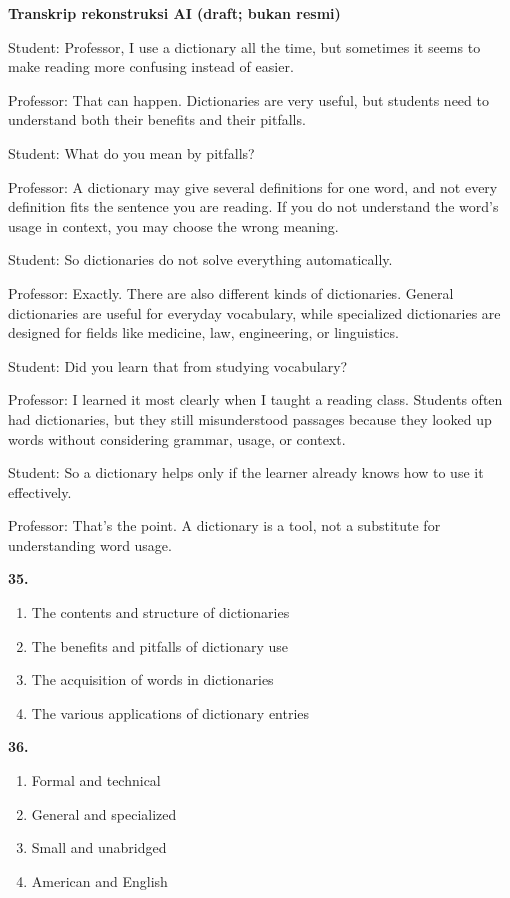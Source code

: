 \documentclass[12pt]{article}
\begin{document}
\begin{exampleblock}
\textbf{Transkrip rekonstruksi AI (draft; bukan resmi)}\par
Student: Professor, I use a dictionary all the time, but sometimes it seems to make reading more confusing instead of easier.\par
Professor: That can happen. Dictionaries are very useful, but students need to understand both their benefits and their pitfalls.\par
Student: What do you mean by pitfalls?\par
Professor: A dictionary may give several definitions for one word, and not every definition fits the sentence you are reading. If you do not understand the word's usage in context, you may choose the wrong meaning.\par
Student: So dictionaries do not solve everything automatically.\par
Professor: Exactly. There are also different kinds of dictionaries. General dictionaries are useful for everyday vocabulary, while specialized dictionaries are designed for fields like medicine, law, engineering, or linguistics.\par
Student: Did you learn that from studying vocabulary?\par
Professor: I learned it most clearly when I taught a reading class. Students often had dictionaries, but they still misunderstood passages because they looked up words without considering grammar, usage, or context.\par
Student: So a dictionary helps only if the learner already knows how to use it effectively.\par
Professor: That's the point. A dictionary is a tool, not a substitute for understanding word usage.\par
\end{exampleblock}
\noindent\textbf{35.}
\begin{enumerate}[label=(\Alph*),leftmargin=*,itemsep=0.2em]
\item The contents and structure of dictionaries
\item The benefits and pitfalls of dictionary use
\item The acquisition of words in dictionaries
\item The various applications of dictionary entries
\end{enumerate}
\par
\vspace{0.25\baselineskip}
\noindent\textbf{36.}
\begin{enumerate}[label=(\Alph*),leftmargin=*,itemsep=0.2em]
\item Formal and technical
\item General and specialized
\item Small and unabridged
\item American and English
\end{enumerate}
\end{document}

